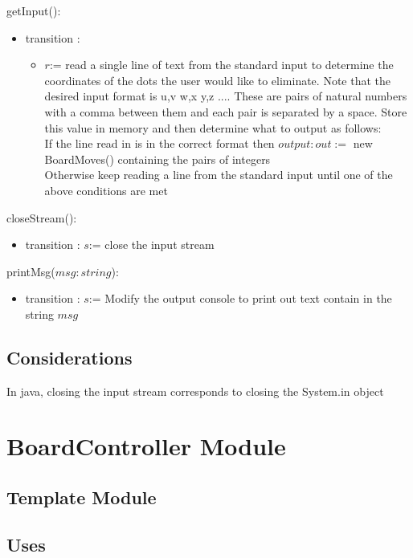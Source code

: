 \documentclass[12pt]{article}
\begin{document}
\noindent getInput(): 
\begin{itemize}
\item transition :
\begin{itemize}
\item $r$:= read a single line of text from the standard input to determine the coordinates of the dots the user would like to eliminate.
Note that the desired input format is u,v w,x y,z .... These are pairs of natural numbers with a comma between them and each pair is separated by a space. Store this value in memory and then determine what to output as follows:\\
If the line read in is in the correct format then $output: out :=$ new BoardMoves() containing the pairs of integers\\
Otherwise keep reading a line from the standard input until one of the above conditions are met
\end{itemize}
\end{itemize}

\noindent closeStream(): 
\begin{itemize}
\item transition : $s$:= close the input stream
\end{itemize}

\noindent printMsg($msg : string$): 
\begin{itemize}
\item transition : $s$:= Modify the output console to print out text contain in the string $msg$
\end{itemize}

\subsection* {Considerations}
\noindent In java, closing the input stream corresponds to closing the System.in object


\newpage

\section* {BoardController Module}

\subsection* {Template Module}


\subsection* {Uses}
\end{document}
